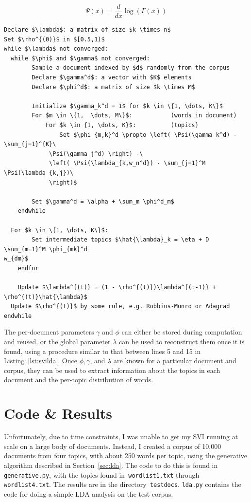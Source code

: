 \documentclass{article}
\begin{document}
\[
  \Psi(x) = \frac{d}{dx} \log \left( \Gamma(x) \right)
\]

\begin{lstlisting}[caption={The SVI-LDA algorithm},label={lst:svilda},
mathescape=true, keywords={}]
Declare $\lambda$: a matrix of size $k \times n$
Set $\rho^{(0)}$ in $[0.5,1)$
while $\lambda$ not converged:
  while $\phi$ and $\gamma$ not converged:
		Sample a document indexed by $d$ randomly from the corpus
		Declare $\gamma^d$: a vector with $K$ elements
		Declare $\phi^d$: a matrix of size $k \times M$

		Initialize $\gamma_k^d = 1$ for $k \in \{1, \dots, K\}$
		For $m \in \{1,  \dots, M\}$: 			(words in document)
			For $k \in {1, \dots, K}$: 			(topics)
				Set $\phi_{m,k}^d \propto \left( \Psi(\gamma_k^d) - \sum_{j=1}^{K}\
             \Psi(\gamma_j^d) \right) -\
             \left( \Psi(\lambda_{k,w_n^d}) - \sum_{j=1}^M \Psi(\lambda_{k,j})\
             \right)$
		
		Set $\gamma^d = \alpha + \sum_m \phi^d_m$
	endwhile

  For $k \in \{1, \dots, K\}$:
		Set intermediate topics $\hat{\lambda}_k = \eta + D \sum_{m=1}^M \phi_{mk}^d
w_{dm}$
	endfor

	Update $\lambda^{(t)} = (1 - \rho^{(t)})\lambda^{(t-1)} + \rho^{(t)}\hat{\lambda}$
  Update $\rho^{(t)}$ by some rule, e.g. Robbins-Munro or Adagrad 
endwhile

\end{lstlisting}

The per-document parameters $\gamma$ and $\phi$ can either be stored during
computation and reused, or the global parameter $\lambda$ can be used to
reconstruct them once it is found, using a procedure similar to that between
lines 5 and 15 in Listing~\ref{lst:svilda}. Once $\phi, \gamma$, and $\lambda$
are known for a particular document and corpus, they can be used to extract
information about the topics in each document and the per-topic distribution of words.

\section{Code \& Results}

Unfortunately, due to time constraints, I was unable to get my SVI running at
scale on a large body of documents. Instead, I created a corpus of 10,000
documents from four topics, with about 250 words per topic, using the generative
algorithm described in Section~\ref{sec:lda}. The code to do this is found
in\texttt{ generative.py}, with the topics found in\texttt{ wordlist1.txt}
through\texttt{ wordlist4.txt}. The results are in the directory\texttt{ testdocs}.
\texttt{lda.py} contains the code for doing a simple LDA analysis on the test
corpus.
\end{document}
